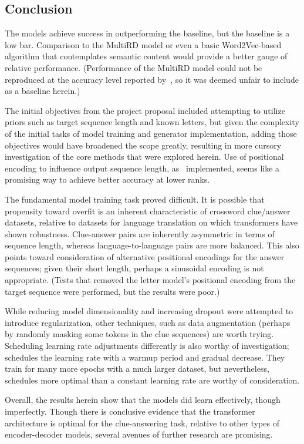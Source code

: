 \documentclass[letterpaper]{article} %
\begin{document}
\begin{NoHyper}
\section{Conclusion}
\label{sec:conclusion}

The models achieve success in outperforming the baseline, but the baseline is a low bar.
Comparison to the MultiRD model or even a basic Word2Vec-based algorithm that contemplates semantic content would provide a better gauge of relative performance.
(Performance of the MultiRD model could not be reproduced at the accuracy level reported by~\citealp{zhang2019multichannel}, so it was deemed unfair to include as a baseline herein.)

The initial objectives from the project proposal included attempting to utilize priors such as  target sequence length and known letters, but given the complexity of the initial tasks of model training and generator implementation, adding those objectives would have broadened the scope greatly, resulting in more cursory investigation of the core methods that were explored herein.
Use of positional encoding to influence output sequence length, as~\citealp{takase2019positional} implemented, seems like a promising way to achieve better accuracy at lower ranks.

The fundamental model training task proved difficult.
It is possible that propensity toward overfit is an inherent characteristic of crossword clue/answer datasets, relative to datasets for language translation on which transformers have shown robustness.
Clue-answer pairs are inherently asymmetric in terms of sequence length, whereas language-to-language pairs are more balanced.
This also points toward consideration of alternative positional encodings for the answer sequences; given their short length, perhaps a sinusoidal encoding is not appropriate.
(Tests that removed the letter model's positional encoding from the target sequence were performed, but the results were poor.)

While reducing model dimensionality and increasing dropout were attempted to introduce regularization, other techniques, such as data augmentation (perhaps by randomly masking some tokens in the clue sequences) are worth trying.
Scheduling learning rate adjustments differently is also worthy of investigation; \citealp{vaswani2017} schedules the learning rate with a warmup period and gradual decrease.
They train for many more epochs with a much larger dataset, but nevertheless, schedules more optimal than a constant learning rate are worthy of consideration.

Overall, the results herein show that the models did learn effectively, though imperfectly.
Though there is conclusive evidence that the transformer architecture is optimal for the clue-answering task, relative to other types of encoder-decoder models, several avenues of further research are promising.



\end{NoHyper}
\end{document}
